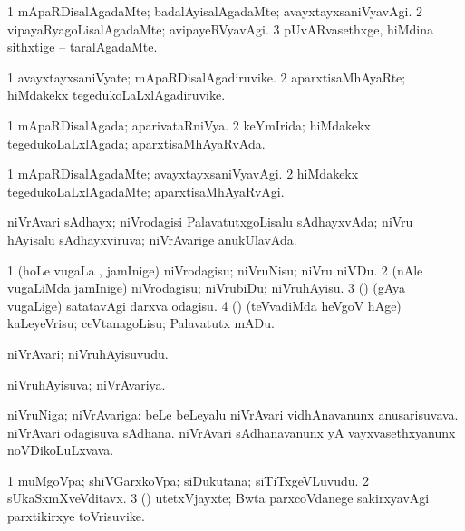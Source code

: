 \bentry
{}
\gl{\kirxvi}
\bmng
\bnum
\num{1} mApaRDisalAgadaMte; badalAyisalAgadaMte; avayxtayxsaniVyavAgi. 
\num{2} vipayaRyagoLisalAgadaMte; avipayeRVyavAgi. 
\num{3} pUvARvasethxge, hiMdina sithxtige -- taralAgadaMte. 
\enum
\emng
\eentry

\bentry
{}
\gl{\nA}
\bmng
\bnum
\num{1} avayxtayxsaniVyate; mApaRDisalAgadiruvike. 
\num{2} aparxtisaMhAyaRte; hiMdakekx tegedukoLaLxlAgadiruvike. 
\enum
\emng
\eentry

\bentry
{}
\gl{\gu}
\bmng
\bnum
\num{1} mApaRDisalAgada; aparivataRniVya. 
\num{2} keYmIrida; hiMdakekx tegedukoLaLxlAgada; aparxtisaMhAyaRvAda. 
\enum
\emng
\eentry

\bentry
{}
\gl{\kirxvi}
\bmng
\bnum
\num{1} mApaRDisalAgadaMte; avayxtayxsaniVyavAgi. 
\num{2} hiMdakekx tegedukoLaLxlAgadaMte; aparxtisaMhAyaRvAgi. 
\enum
\emng
\eentry

\bentry
{}
\gl{\gu}
\bmng
niVrAvari sAdhayx; niVrodagisi PalavatutxgoLisalu sAdhayxvAda; niVru hAyisalu sAdhayxviruva; niVrAvarige anukUlavAda. 
\emng
\eentry

\bentry
{}
\gl{\sakirx}
\bmng
\bnum
\num{1} (hoLe \mo vugaLa \vi, jamInige) niVrodagisu; niVruNisu; niVru niVDu. 
\num{2} (nAle \mo vugaLiMda jamInige) niVrodagisu; niVrubiDu; niVruhAyisu. 
\num{3} (\veYshA) (gAya \mo vugaLige) satatavAgi darxva odagisu. 
\num{4} (\rUpa) (teVvadiMda heVgoV hAge) kaLeyeVrisu; ceVtanagoLisu; Palavatutx mADu. 
\enum
\emng
\eentry

\bentry
{}
\gl{\nA}
\bmng
niVrAvari; niVruhAyisuvudu. 
\emng
\eentry

\bentry
{}
\gl{\gu}
\bmng
niVruhAyisuva; niVrAvariya. 
\emng
\eentry

\bentry
{}
\gl{\nA}
\bmng
niVruNiga; niVrAvariga: 
\banum
{} beLe beLeyalu niVrAvari vidhAnavanunx anusarisuvava. 
 niVrAvari odagisuva sAdhana. 
 niVrAvari sAdhanavanunx yA vayxvasethxyanunx noVDikoLuLxvava. 
\eanum
\emng
\eentry

\bentry
{}
\gl{\nA}
\bmng
\bnum
\num{1} muMgoVpa; shiVGarxkoVpa; siDukutana; siTiTxgeVLuvudu. 
\num{2} sUkaSxmXveVditavx. 
\num{3} (\jiVvi) utetxVjayxte; Bwta parxcoVdanege sakirxyavAgi parxtikirxye toVrisuvike. 
\enum
\emng
\eentry

